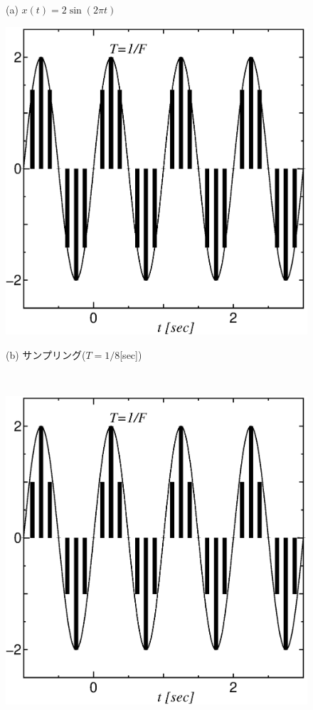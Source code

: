 \begin{figure}[H]
\begin{center}
\begin{minipage}{.38\textwidth}
\begin{center}
(a) $x(t)=2 \sin (2\pi t)$
\end{center}
\end{minipage}
\begin{minipage}{.38\textwidth}
\begin{center}
\includegraphics[width=.95\textwidth]{fig/zu-1-2-b.eps}

(b) サンプリング($T=1/8$[sec])
\end{center}
\end{minipage}\\[.5\baselineskip]
\begin{minipage}{.38\textwidth}
\begin{center}
\includegraphics[width=.95\textwidth]{fig/zu-1-2-c.eps}


\end{center}
\end{minipage}
\end{center}
\end{figure}
